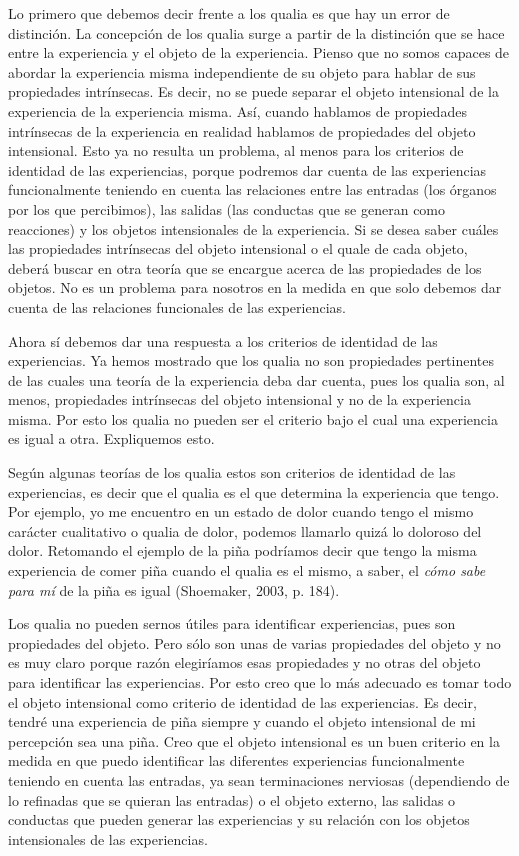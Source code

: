 \documentclass[]{book}
\begin{document}
Lo primero que debemos decir frente a los qualia es que hay un error de
distinción. La concepción de los qualia surge a partir de la distinción
que se hace entre la experiencia y el objeto de la experiencia. Pienso
que no somos capaces de abordar la experiencia misma independiente de su
objeto para hablar de sus propiedades intrínsecas. Es decir, no se puede
separar el objeto intensional de la experiencia de la experiencia misma.
Así, cuando hablamos de propiedades intrínsecas de la experiencia en
realidad hablamos de propiedades del objeto intensional. Esto ya no
resulta un problema, al menos para los criterios de identidad de las
experiencias, porque podremos dar cuenta de las experiencias
funcionalmente teniendo en cuenta las relaciones entre las entradas (los
órganos por los que percibimos), las salidas (las conductas que se
generan como reacciones) y los objetos intensionales de la experiencia.
Si se desea saber cuáles las propiedades intrínsecas del objeto
intensional o el quale de cada objeto, deberá buscar en otra teoría que
se encargue acerca de las propiedades de los objetos. No es un problema
para nosotros en la medida en que solo debemos dar cuenta de las
relaciones funcionales de las experiencias.

Ahora sí debemos dar una respuesta a los criterios de identidad de las
experiencias. Ya hemos mostrado que los qualia no son propiedades
pertinentes de las cuales una teoría de la experiencia deba dar cuenta,
pues los qualia son, al menos, propiedades intrínsecas del objeto
intensional y no de la experiencia misma. Por esto los qualia no pueden
ser el criterio bajo el cual una experiencia es igual a otra.
Expliquemos esto.

Según algunas teorías de los qualia estos son criterios de identidad de
las experiencias, es decir que el qualia es el que determina la
experiencia que tengo. Por ejemplo, yo me encuentro en un estado de
dolor cuando tengo el mismo carácter cualitativo o qualia de dolor,
podemos llamarlo quizá lo doloroso del dolor. Retomando el ejemplo de la
piña podríamos decir que tengo la misma experiencia de comer piña cuando
el qualia es el mismo, a saber, el \emph{cómo sabe para mí} de la piña
es igual (Shoemaker, 2003, p. 184).

Los qualia no pueden sernos útiles para identificar experiencias, pues
son propiedades del objeto. Pero sólo son unas de varias propiedades del
objeto y no es muy claro porque razón elegiríamos esas propiedades y no
otras del objeto para identificar las experiencias. Por esto creo que lo
más adecuado es tomar todo el objeto intensional como criterio de
identidad de las experiencias. Es decir, tendré una experiencia de piña
siempre y cuando el objeto intensional de mi percepción sea una piña.
Creo que el objeto intensional es un buen criterio en la medida en que
puedo \protect\hypertarget{_Hlk508645306}{}{}identificar las diferentes
experiencias funcionalmente teniendo en cuenta las entradas, ya sean
terminaciones nerviosas (dependiendo de lo refinadas que se quieran las
entradas) o el objeto externo, las salidas o conductas que pueden
generar las experiencias y su relación con los objetos intensionales de
las experiencias.
\end{document}
